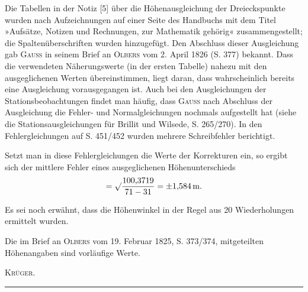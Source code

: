\par\noindent\hspace*{\parindent}Die Tabellen in der Notiz [5] über die Höhenausgleichung der
Dreieckspunkte wurden nach Aufzeichnungen auf einer Seite des Handbuchs mit dem Titel
»Aufsätze, Notizen und Rechnungen, zur Mathematik gehörig« zusammengestellt;
die Spaltenüberschriften wurden hinzugefügt. Den Abschluss dieser
Ausgleichung gab \textsc{Gauss} in seinem Brief an \textsc{Olbers} vom
2. April 1826 (S. 377) bekannt. Dass die verwendeten Näherungswerte (in der ersten Tabelle)
nahezu mit den ausgeglichenen Werten übereinstimmen, liegt daran, dass wahrscheinlich
bereits eine Ausgleichung vorausgegangen ist. Auch bei den Ausgleichungen der
Stationsbeobachtungen findet man häufig, dass \textsc{Gauss} nach Abschluss der
Ausgleichung die Fehler- und Normalgleichungen nochmals aufgestellt hat
(siehe die Stationsausgleichungen für Brillit und Wilsede, S. 265/270).
In den Fehlergleichungen auf S. 451/452 wurden mehrere Schreibfehler berichtigt.
\par\noindent\hspace*{\parindent}Setzt man in diese Fehlergleichungen die Werte der Korrekturen ein,
so ergibt sich der mittlere Fehler eines ausgeglichenen Höhenunterschieds
\[
=\surd\frac{100{,}3719}{71-31}=\pm1{,}584\,\text{m}.
\]
\par\noindent\hspace*{\parindent}Es sei noch erwähnt, dass die Höhenwinkel in der Regel aus
20 Wiederholungen ermittelt wurden.
\par\noindent\hspace*{\parindent}Die im Brief an \textsc{Olbers} vom 19. Februar 1825, S. 373/374,
mitgeteilten Höhenangaben sind vorläufige Werte.\par\noindent\hfill\textsc{Krüger.}\par
\endgroup
\par\medskip
\begin{center}\rule{.24\linewidth}{.4pt}\end{center}

